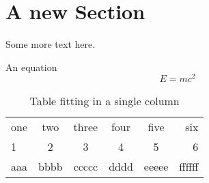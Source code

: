 \documentclass{pramana}
\begin{document}
\section{A new Section}
Some more  text here.  

An equation
\begin{equation}
E=mc^2
\end{equation}


\begin{table}[htb]
\caption{Table fitting in a single column}\label{tableExample}
\begin{tabular}{|l|cccc|r|}
\hline
one& two &three&four&five&six\\
1&2&3&4&5&6\\
aaa&bbbb& ccccc&dddd&eeeee&ffffff\\
\hline
\end{tabular}
\end{table}








\end{document}
